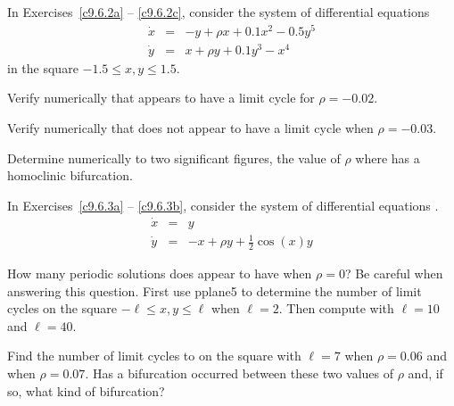 \noindent In Exercises~\ref{c9.6.2a} -- \ref{c9.6.2c}, consider the system 
of differential equations 
\begin{equation*}  \label{E:homo2}
\begin{array}{rcl}
\dot{x} & = & -y + \rho x + 0.1 x^2 - 0.5 y^5 \\
\dot{y} & = & x +\rho y + 0.1 y^3 - x^4
\end{array}
\end{equation*}
in the square $-1.5\leq x,y\leq 1.5$.
\begin{exercise} \label{c9.6.2a}
Verify numerically that  appears to have a limit cycle for 
$\rho=-0.02$.
\end{exercise} 
\begin{exercise} \label{c9.6.2b}
Verify numerically that  does not appear to have a limit cycle 
when $\rho=-0.03$.
\end{exercise} 
\begin{exercise} \label{c9.6.2c}
Determine numerically to two significant figures, the value of $\rho$
where  has a homoclinic bifurcation. 
\end{exercise} 

\noindent In Exercises~\ref{c9.6.3a} -- \ref{c9.6.3b}, consider the system 
of differential equations .
\begin{equation*}  \label{E:infinity}
\begin{array}{rcl}
\dot{x} & = & y \\
\dot{y} & = & -x +\rho y + \frac{1}{2}\cos(x)y
\end{array}
\end{equation*}
\begin{exercise} \label{c9.6.3a}
How many periodic solutions does  appear to have 
when $\rho=0$?  Be careful when answering this question.  First use 
{\sf pplane5} to determine the number of limit cycles on the square 
$-\ell \leq x,y \leq\ell$ when $\ell=2$.  Then compute with $\ell=10$ and 
$\ell=40$.
\end{exercise}
\begin{exercise} \label{c9.6.3b}
Find the number of limit cycles to  on the square 
with $\ell=7$ when $\rho=0.06$ and when $\rho=0.07$.  Has a bifurcation
 occurred between these two values of $\rho$ and, if so, what kind of 
bifurcation?
\end{exercise}

